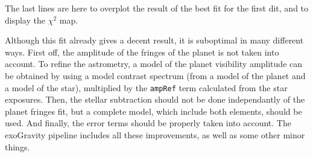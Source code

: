 \noindent{}The last lines are here to overplot the result of the best fit for the first dit, and to display the $\chi^2$ map.

Although this fit already gives a decent result, it is suboptimal in many different ways. First off, the amplitude of the fringes of the planet is not taken into account. To refine the astrometry, a model of the planet visibility amplitude can be obtained by using a model contrast spectrum (from a model of the planet and a model of the star), multiplied by the \verb|ampRef| term calculated from the star exposures. Then, the stellar subtraction should not be done independantly of the planet fringes fit, but a complete model, which include both elements, should be used. And finally, the error terms should be properly taken into account. The exoGravity pipeline includes all these improvements, as well as some other minor things.

